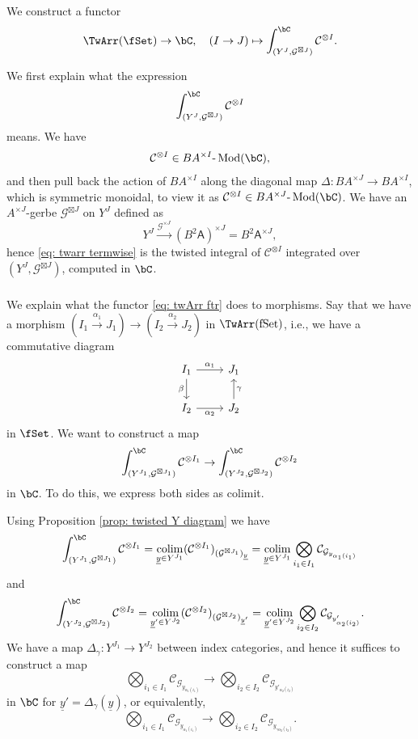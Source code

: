 \documentclass[10pt]{amsart}
\newcommand{\sssec}{\subsubsection}
\theoremstyle{remark}
\newcommand{\ul}{\underline}
\newcommand{\on}{\operatorname}
\newcommand{\cC}{\mathcal{C}}
\newcommand{\cG}{\mathcal{G}}
\newcommand{\lMod}{\text{-}\on{Mod}}
\DeclareMathOperator{\colim}{colim}
\newcommand{\sfA}{\mathsf{A}}
\begin{document}
\sssec{}
We construct a functor
\begin{equation}\label{eq: twArr ftr}    \TwArr(\fSet)\rightarrow \bC, \quad (I\rightarrow J)\mapsto \int^{\bC}_{(Y^J,\cG^{\boxtimes J})}\cC^{\otimes I}.
\end{equation}

We first explain what the expression
\begin{equation}\label{eq: twarr termwise}
    \int^{\bC}_{(Y^J,\cG^{\boxtimes J})}\cC^{\otimes I}
\end{equation}
means. We have
\[\cC^{\otimes I}\in BA^{\times I}\lMod(\bC),\]
and then pull back the action of $BA^{\times I}$ along the diagonal map
$\Delta:BA^{\times J}\rightarrow BA^{\times I}$,
which is symmetric monoidal,
to view it as $\cC^{\otimes I}\in BA^{\times J}\lMod(\bC)$.
We have an $A^{\times J}$-gerbe $\cG^{\boxtimes J}$ on $Y^{J}$ defined as
\[Y^J\xrightarrow{\cG^{\times J}} (B^2 \sfA)^{\times J}=B^2 \sfA^{\times J},\]
hence \eqref{eq: twarr termwise} is the twisted integral of $\cC^{\otimes I}$ integrated over $(Y^J, \cG^{\boxtimes J})$, computed in $\bC$.

\sssec{}
We explain what the functor \eqref{eq: twArr ftr} does to morphisms.
Say that we have a morphism $(I_1\xrightarrow{\alpha_1} J_1)\rightarrow (I_2\xrightarrow{\alpha_2} J_2)$ in $\TwArr(\on{fSet})$, i.e., we have a commutative diagram
\[\begin{tikzcd}
	{I_1} & {J_1} \\
	{I_2} & {J_2}
	\arrow["{\alpha_1}", from=1-1, to=1-2]
	\arrow["\beta"', from=1-1, to=2-1]
	\arrow["{\alpha_2}"', from=2-1, to=2-2]
	\arrow["\gamma"', from=2-2, to=1-2]
\end{tikzcd}\]
in $\fSet$. We want to construct a map
\[\int^{\bC}_{(Y^{J_1},\cG^{\boxtimes J_1})}\cC^{\otimes I_1}\rightarrow \int^{\bC}_{(Y^{J_2},\cG^{\boxtimes J_2})}\cC^{\otimes I_2}\]
in $\bC$. To do this, we express both sides as colimit. 
\medskip

Using Proposition \ref{prop: twisted Y diagram} we have
\[\int^{\bC}_{(Y^{J_1},\cG^{\boxtimes J_1})}\cC^{\otimes I_1}=\colim_{\ul{y}\in Y^{J_1}} (\cC^{\otimes I_1})_{(\cG^{\boxtimes J_1})_{\ul{y}}}=\colim_{\ul{y}\in Y^{J_1}} \bigotimes_{i_1\in I_1}\cC_{\cG_{y_{\alpha_1(i_1)}}}\]
and
\[ \int^{\bC}_{(Y^{J_2},\cG^{\boxtimes J_2})}\cC^{\otimes I_2}=
\colim_{\ul{y}'\in Y^{J_2}} (\cC^{\otimes I_2})_{(\cG^{\boxtimes J_2})_{\ul{y}'}}=\colim_{\ul{y}'\in Y^{J_2}} \bigotimes_{i_2\in I_2}\cC_{\cG_{y'_{\alpha_2(i_2)}}}.\]
We have a map $\Delta_{\gamma}:Y^{J_1}\rightarrow Y^{J_2}$ between index categories, and hence it suffices to construct a map
\[\bigotimes_{i_1\in I_1}\cC_{\cG_{y_{\alpha_1(i_1)}}}\rightarrow \bigotimes_{i_2\in I_2}\cC_{\cG_{y'_{\alpha_2(i_2)}}}\]
in $\bC$ for $\ul{y}'=\Delta_{\gamma}(\ul{y})$, or equivalently,
\begin{equation}\label{eq: term by term}
    \bigotimes_{i_1\in I_1}\cC_{\cG_{y_{\alpha_1(i_1)}}}\rightarrow \bigotimes_{i_2\in I_2}\cC_{\cG_{y_{\gamma\alpha_2(i_2)}}}.
\end{equation}
\end{document}
